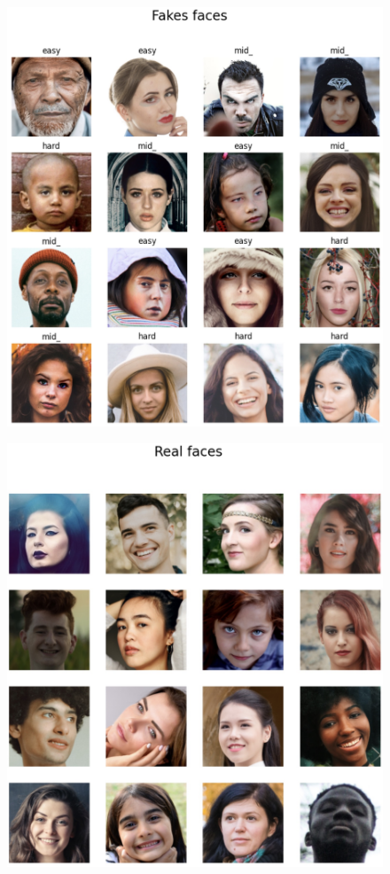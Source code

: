 \documentclass[final]{cvpr}
\begin{document}
\begin{itemize}
\begin{figure}[t]
\centering
\begin{minipage}{0.45\linewidth}
   \includegraphics[width=\linewidth]{images/Dataset1_Fakeface.jpg}
   \label{fig:image1}
\end{minipage}
\hfill
\begin{minipage}{0.45\linewidth}
   \includegraphics[width=\linewidth]{images/Dataset1_Realface.jpg}

\end{minipage}
\end{figure}
\end{itemize}
\end{document}
